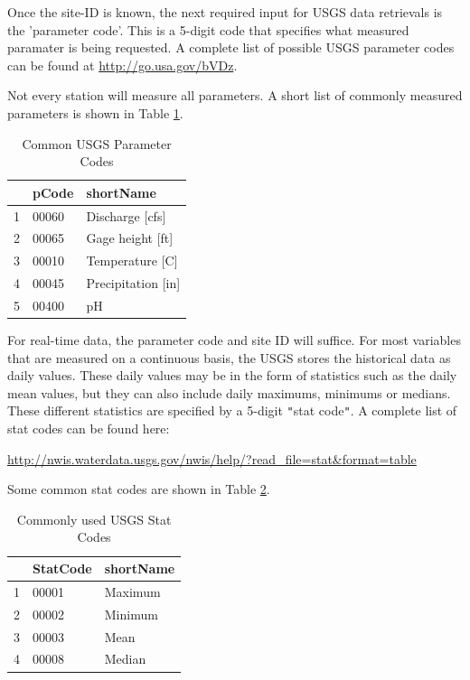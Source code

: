\documentclass[a4paper,11pt]{article}\usepackage[]{graphicx}\usepackage[]{color}
\begin{document}
Once the site-ID is known, the next required input for USGS data retrievals is the 'parameter code'.  This is a 5-digit code that specifies what measured paramater is being requested.  A complete list of possible USGS parameter codes can be found at \url{http://go.usa.gov/bVDz}.

Not every station will measure all parameters. A short list of commonly measured parameters is shown in Table \ref{tab:params}.


\begin{table}[ht]
\centering
\begin{tabular}{rll}
  \hline
 & pCode & shortName \\ 
  \hline
1 & 00060 & Discharge [cfs] \\ 
  2 & 00065 & Gage height [ft] \\ 
  3 & 00010 & Temperature [C] \\ 
  4 & 00045 & Precipitation [in] \\ 
  5 & 00400 & pH \\ 
   \hline
\end{tabular}
\caption{Common USGS Parameter Codes} 
\label{tab:params}
\end{table}



For real-time data, the parameter code and site ID will suffice.  For most variables that are measured on a continuous basis, the USGS stores the historical data as daily values.  These daily values may be in the form of statistics such as the daily mean values, but they can also include daily maximums, minimums or medians.  These different statistics are specified by a 5-digit \texttt{"}stat code\texttt{"}.  A complete list of stat codes can be found here:

\url{http://nwis.waterdata.usgs.gov/nwis/help/?read_file=stat&format=table}

Some common stat codes are shown in Table \ref{tab:stat}.
\begin{table}[ht]
\centering
\begin{tabular}{rll}
  \hline
 & StatCode & shortName \\ 
  \hline
1 & 00001 & Maximum \\ 
  2 & 00002 & Minimum \\ 
  3 & 00003 & Mean \\ 
  4 & 00008 & Median \\ 
   \hline
\end{tabular}
\caption{Commonly used USGS Stat Codes} 
\label{tab:stat}
\end{table}
\end{document}
